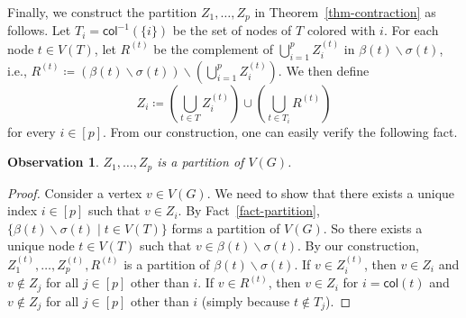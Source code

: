 \documentclass[a4paper,11pt]{article}
\numberwithin{lemma}{section}
\newtheorem{observation}[lemma]{Observation}
\begin{document}
Finally, we construct the partition $Z_1,\dots,Z_p$ in Theorem~\ref{thm-contraction} as follows.
Let $T_i = \mathsf{col}^{-1}(\{i\})$ be the set of nodes of $T$ colored with $i$.
For each node $t \in V(T)$, let $R^{(t)}$ be the complement of $\bigcup_{i=1}^p Z_i^{(t)}$ in $\beta(t) \backslash \sigma(t)$, i.e., $R^{(t)} \coloneqq (\beta(t) \backslash \sigma(t)) \backslash (\bigcup_{i=1}^p Z_i^{(t)})$.
We then define
\begin{equation}
 Z_i \coloneqq \left(\bigcup_{t \in T} Z_i^{(t)}\right) \cup \left(\bigcup_{t \in T_i} R^{(t)}\right)
\end{equation}
for every $i \in [p]$.
From our construction, one can easily verify the following fact.
\begin{observation}
$Z_1,\dots,Z_p$ is a partition of $V(G)$.
\end{observation}
\begin{proof}
Consider a vertex $v \in V(G)$.
We need to show that there exists a unique index $i \in [p]$ such that $v \in Z_i$.
By Fact~\ref{fact-partition}, $\{\beta(t) \backslash \sigma(t) \mid t \in V(T)\}$ forms a partition of $V(G)$.
So there exists a unique node $t \in V(T)$ such that $v \in \beta(t) \backslash \sigma(t)$.
By our construction, $Z_1^{(t)},\dots,Z_p^{(t)},R^{(t)}$ is a partition of $\beta(t) \backslash \sigma(t)$.
If $v \in Z_i^{(t)}$, then $v \in Z_i$ and $v \notin Z_j$ for all $j \in [p]$ other than $i$.
If $v \in R^{(t)}$, then $v \in Z_i$ for $i = \mathsf{col}(t)$ and $v \notin Z_j$ for all $j \in [p]$ other than $i$ (simply because $t \notin T_j$).
\end{proof}
\end{document}
